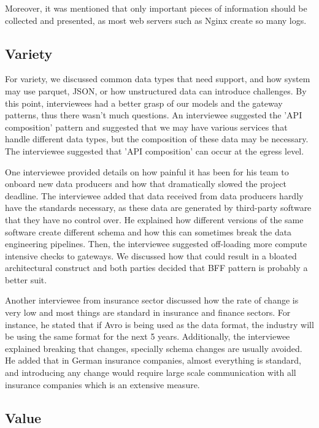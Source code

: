 \documentclass{bmcart}
\begin{document}
Moreover, it was mentioned that only important pieces of information should be collected and presented, as most web servers such as Nginx create so many logs. 

\subsection{Variety}

For variety, we discussed common data types that need support, and how system may use parquet, JSON, or how unstructured data can introduce challenges. By this point, interviewees had a better grasp of our models and the gateway patterns, thus there wasn't much questions. An interviewee suggested the 'API composition' pattern and suggested that we may have various services that handle different data types, but the composition of these data may be necessary. The interviewee suggested that 'API composition' can occur at the egress level. 

One interviewee provided details on how painful it has been for his team to onboard new data producers and how that dramatically slowed the project deadline. The interviewee added that data received from data producers hardly have the standards necessary, as these data are generated by third-party software that they have no control over. He explained how different versions of the same software create different schema and how this can sometimes break the data engineering pipelines. Then, the interviewee suggested off-loading more compute intensive checks to gateways. We discussed how that could result in a bloated architectural construct and both parties decided that BFF pattern is probably a better suit.  

Another interviewee from insurance sector discussed how the rate of change is very low and most things are standard in insurance and finance sectors. For instance, he stated that if Avro is being used as the data format, the industry will be using the same format for the next 5 years. Additionally, the interviewee explained breaking that changes, specially schema changes are usually avoided. He added that in German insurance companies, almost everything is standard, and introducing any change would require large scale communication with all insurance companies which is an extensive measure. 


\subsection{Value}
\end{document}
